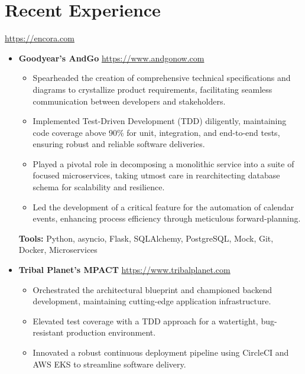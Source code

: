 \documentclass[11pt,a4paper,english]{moderncv}
\begin{document}
\maketitle

\section{Recent Experience}

{
\url{https://encora.com}
\newline{}
\begin{itemize}
    \item \textbf{Goodyear's AndGo}
        \newline{}
        \url{https://www.andgonow.com}
        \begin{itemize}
            \item Spearheaded the creation of comprehensive technical specifications and diagrams to crystallize product requirements, facilitating seamless communication between developers and stakeholders.
            \item Implemented Test-Driven Development (TDD) diligently, maintaining code coverage above 90\% for unit, integration, and end-to-end tests, ensuring robust and reliable software deliveries.
            \item Played a pivotal role in decomposing a monolithic service into a suite of focused microservices, taking utmost care in rearchitecting database schema for scalability and resilience.
            \item Led the development of a critical feature for the automation of calendar events, enhancing process efficiency through meticulous forward-planning.
        \end{itemize}
        \textbf{Tools:} Python, asyncio, Flask, SQLAlchemy, PostgreSQL, Mock, Git, Docker, Microservices
    \item \textbf{Tribal Planet's MPACT}
        \newline{}
        \url{https://www.tribalplanet.com}
        \begin{itemize}
            \item Orchestrated the architectural blueprint and championed backend development, maintaining cutting-edge application infrastructure.
            \item Elevated test coverage with a TDD approach for a watertight, bug-resistant production environment.
            \item Innovated a robust continuous deployment pipeline using CircleCI and AWS EKS to streamline software delivery. 

\end{itemize}
\end{itemize}}
\end{document}
